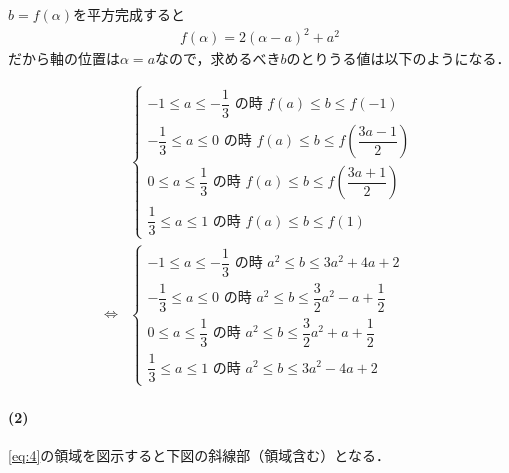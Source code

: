 \documentclass[../../main.tex]{subfiles}
\begin{document}
$b=f(\alpha)$を平方完成すると
\begin{align}
  f(\alpha) = 2\left(\alpha - a\right)^2 + a^2 \label{eq:3}
\end{align}
だから軸の位置は$\alpha = a$なので，求めるべき$b$のとりうる値は以下のようになる．

\begin{align}
  &
  \begin{cases}
    -1 \le a \le -\dfrac{1}{3} \text{ の時 } f(a) \le b \le f(-1) \\
    -\dfrac{1}{3} \le a \le 0 \text{ の時 } f(a) \le b \le f\left(\dfrac{3a-1}{2}\right) \\
    0 \le a \le \dfrac{1}{3} \text{ の時 } f(a) \le b \le f\left(\dfrac{3a+1}{2}\right) \\
    \dfrac{1}{3} \le a \le 1 \text{ の時 } f(a) \le b \le f(1)
  \end{cases} \\
  \iff
  &
  \begin{cases}
    -1 \le a \le -\dfrac{1}{3} \text{ の時 } a^2 \le b \le 3a^2 + 4a + 2 \\
    -\dfrac{1}{3} \le a \le 0 \text{ の時 } a^2 \le b \le \dfrac{3}{2}a^2 - a + \dfrac{1}{2} \\
    0 \le a \le \dfrac{1}{3} \text{ の時 } a^2 \le b \le \dfrac{3}{2}a^2 + a + \dfrac{1}{2} \\
    \dfrac{1}{3} \le a \le 1 \text{ の時 } a^2 \le b \le 3a^2 - 4a + 2
  \end{cases} \label{eq:4}
\end{align}

\paragraph{(2)}

\cref{eq:4}の領域を図示すると下図の斜線部（領域含む）となる．
\end{document}
